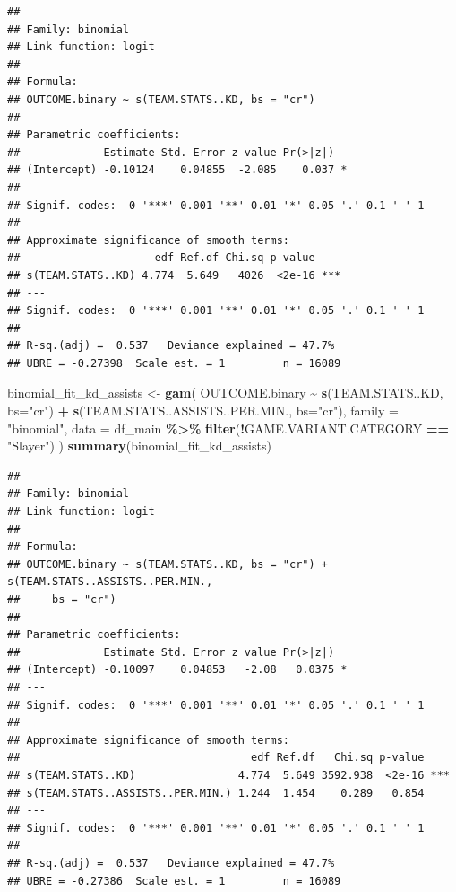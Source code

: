 \documentclass[
]{article}
\newenvironment{Shaded}{\begin{snugshade}}{\end{snugshade}}
\newcommand{\AttributeTok}[1]{\textcolor[rgb]{0.13,0.29,0.53}{#1}}
\newcommand{\FunctionTok}[1]{\textcolor[rgb]{0.13,0.29,0.53}{\textbf{#1}}}
\newcommand{\NormalTok}[1]{#1}
\newcommand{\OtherTok}[1]{\textcolor[rgb]{0.56,0.35,0.01}{#1}}
\newcommand{\SpecialCharTok}[1]{\textcolor[rgb]{0.81,0.36,0.00}{\textbf{#1}}}
\newcommand{\StringTok}[1]{\textcolor[rgb]{0.31,0.60,0.02}{#1}}
\begin{document}
\begin{verbatim}
## 
## Family: binomial 
## Link function: logit 
## 
## Formula:
## OUTCOME.binary ~ s(TEAM.STATS..KD, bs = "cr")
## 
## Parametric coefficients:
##             Estimate Std. Error z value Pr(>|z|)  
## (Intercept) -0.10124    0.04855  -2.085    0.037 *
## ---
## Signif. codes:  0 '***' 0.001 '**' 0.01 '*' 0.05 '.' 0.1 ' ' 1
## 
## Approximate significance of smooth terms:
##                     edf Ref.df Chi.sq p-value    
## s(TEAM.STATS..KD) 4.774  5.649   4026  <2e-16 ***
## ---
## Signif. codes:  0 '***' 0.001 '**' 0.01 '*' 0.05 '.' 0.1 ' ' 1
## 
## R-sq.(adj) =  0.537   Deviance explained = 47.7%
## UBRE = -0.27398  Scale est. = 1         n = 16089
\end{verbatim}

\begin{Shaded}
\begin{Highlighting}[]
\NormalTok{binomial\_fit\_kd\_assists }\OtherTok{\textless{}{-}} \FunctionTok{gam}\NormalTok{(}
\NormalTok{  OUTCOME.binary }\SpecialCharTok{\textasciitilde{}} \FunctionTok{s}\NormalTok{(TEAM.STATS..KD, }\AttributeTok{bs=}\StringTok{"cr"}\NormalTok{) }\SpecialCharTok{+} \FunctionTok{s}\NormalTok{(TEAM.STATS..ASSISTS..PER.MIN., }\AttributeTok{bs=}\StringTok{"cr"}\NormalTok{),}
  \AttributeTok{family =} \StringTok{"binomial"}\NormalTok{,}
  \AttributeTok{data =}\NormalTok{ df\_main }\SpecialCharTok{\%\textgreater{}\%} 
    \FunctionTok{filter}\NormalTok{(}\SpecialCharTok{!}\NormalTok{GAME.VARIANT.CATEGORY }\SpecialCharTok{==} \StringTok{"Slayer"}\NormalTok{)}
\NormalTok{)}
\FunctionTok{summary}\NormalTok{(binomial\_fit\_kd\_assists)}
\end{Highlighting}
\end{Shaded}

\begin{verbatim}
## 
## Family: binomial 
## Link function: logit 
## 
## Formula:
## OUTCOME.binary ~ s(TEAM.STATS..KD, bs = "cr") + s(TEAM.STATS..ASSISTS..PER.MIN., 
##     bs = "cr")
## 
## Parametric coefficients:
##             Estimate Std. Error z value Pr(>|z|)  
## (Intercept) -0.10097    0.04853   -2.08   0.0375 *
## ---
## Signif. codes:  0 '***' 0.001 '**' 0.01 '*' 0.05 '.' 0.1 ' ' 1
## 
## Approximate significance of smooth terms:
##                                    edf Ref.df   Chi.sq p-value    
## s(TEAM.STATS..KD)                4.774  5.649 3592.938  <2e-16 ***
## s(TEAM.STATS..ASSISTS..PER.MIN.) 1.244  1.454    0.289   0.854    
## ---
## Signif. codes:  0 '***' 0.001 '**' 0.01 '*' 0.05 '.' 0.1 ' ' 1
## 
## R-sq.(adj) =  0.537   Deviance explained = 47.7%
## UBRE = -0.27386  Scale est. = 1         n = 16089
\end{verbatim}
\end{document}
